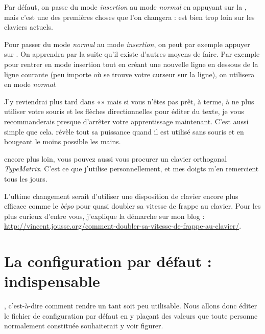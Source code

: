 Par défaut, on passe du mode \emph{insertion} au mode \emph{normal} en appuyant sur la \ttesc, mais c'est une des premières choses que l'on changera : \ttesc est bien trop loin sur les claviers actuels. 

Pour passer du mode \emph{normal} au mode \emph{insertion}, on peut par exemple appuyer sur \tti. On apprendra par la suite qu'il existe d'autres moyens de faire. Par exemple pour rentrer en mode insertion tout en créant une nouvelle ligne en dessous de la ligne courante (peu importe où se trouve votre curseur sur la ligne), on utilisera \tto en mode \emph{normal}.

J'y reviendrai plus tard dans «» mais si vous n'êtes pas prêt, à terme, à ne plus utiliser votre souris et les flèches directionnelles pour éditer du texte, je vous recommanderais presque d'arrêter votre apprentissage maintenant. C'est aussi simple que cela. \vim révèle tout sa puissance quand il est utilisé sans souris et en bougeant le moins possible les mains.

 encore plus loin, vous pouvez aussi vous procurer un clavier orthogonal \emph{TypeMatrix}. C'est ce que j'utilise personnellement, et mes doigts m'en remercient tous les jours.

L'ultime changement serait d'utiliser une disposition de clavier encore plus efficace comme le \emph{bépo} pour quasi doubler sa vitesse de frappe au clavier. Pour les plus curieux d'entre vous, j'explique la démarche sur mon blog : \url{http://vincent.jousse.org/comment-doubler-sa-vitesse-de-frappe-au-clavier/}.


\newpage
\section{La configuration par défaut : indispensable}

, c'est-à-dire comment rendre \vim un tant soit peu utilisable. Nous allons donc éditer le fichier de configuration par défaut \vimrc{} en y plaçant des valeurs que toute personne normalement constituée souhaiterait y voir figurer.

